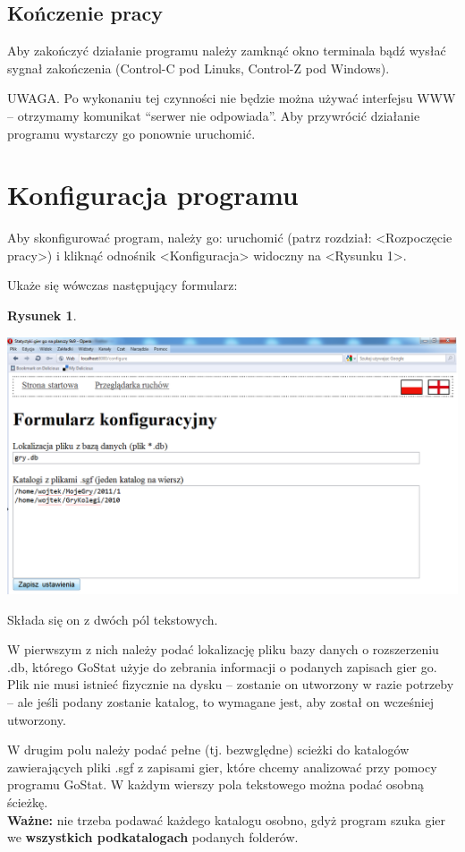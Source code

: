 \documentclass[10pt,leqno]{article}
\newtheorem{rys}{Rysunek}
\begin{document}
\subsection{Kończenie pracy}
Aby zakończyć działanie programu należy zamknąć okno terminala bądź wysłać sygnał zakończenia (Control-C pod Linuks, Control-Z pod Windows).

UWAGA. Po wykonaniu tej czynności nie będzie można używać interfejsu WWW -- otrzymamy komunikat ``serwer nie odpowiada''. Aby przywrócić działanie programu
wystarczy go ponownie uruchomić.

\section{Konfiguracja programu}
Aby skonfigurować program, należy go: uruchomić (patrz rozdział: <Rozpoczęcie pracy>) i kliknąć odnośnik <Konfiguracja> widoczny na <Rysunku 1>.

Ukaże się wówczas następujący formularz:

\newpage

\begin{rys}
\begin{center}
\includegraphics[scale=0.4]{formularz.png}
\end{center}
\end{rys}

Składa się on z dwóch pól tekstowych. 

W pierwszym z nich należy podać lokalizację pliku bazy danych o rozszerzeniu .db, którego GoStat użyje do zebrania informacji o podanych zapisach gier go.
Plik nie musi istnieć fizycznie na dysku -- zostanie on utworzony w razie potrzeby -- ale jeśli podany zostanie katalog, to wymagane jest, aby został on
wcześniej utworzony.

W drugim polu należy podać pełne (tj. bezwględne) scieżki do katalogów zawierających pliki .sgf z zapisami gier, które chcemy analizować przy pomocy
programu GoStat. W każdym wierszy pola tekstowego można podać osobną ścieżkę. \\
\textbf{Ważne:} nie trzeba podawać każdego katalogu osobno, gdyż program szuka gier we \textbf{wszystkich podkatalogach} podanych folderów.
\end{document}
